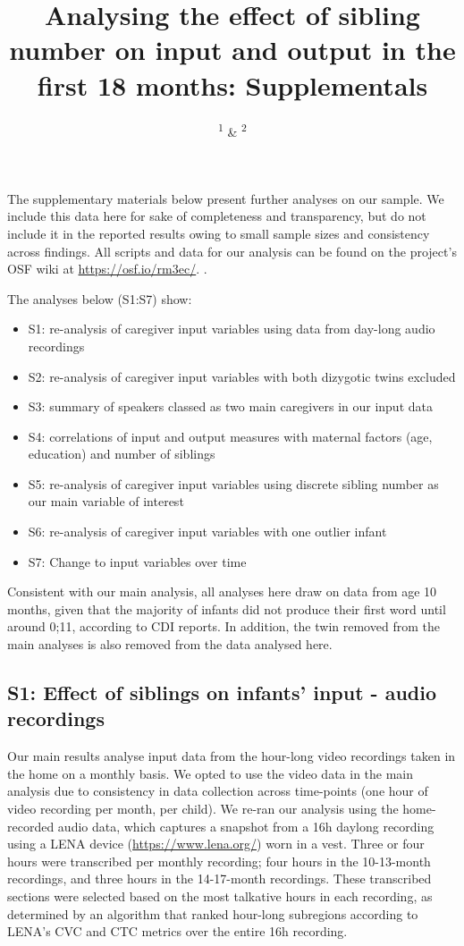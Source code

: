 \documentclass[
  man,mask,floatsintext]{apa6}
\title{Analysing the effect of sibling number on input and output in the first 18 months: Supplementals}
\author{\textsuperscript{1} \& \textsuperscript{2}}
\date{}
\affiliation{\vspace{0.5cm}\textsuperscript{1} \\\textsuperscript{2} }
\providecommand{\tightlist}{%
  \setlength{\itemsep}{0pt}\setlength{\parskip}{0pt}}
\begin{document}
\maketitle

The supplementary materials below present further analyses on our sample. We include this data here for sake of completeness and transparency, but do not include it in the reported results owing to small sample sizes and consistency across findings. All scripts and data for our analysis can be found on the project's OSF wiki at \url{https://osf.io/rm3ec/}. .

The analyses below (S1:S7) show:

\begin{itemize}
\tightlist
\item
  S1: re-analysis of caregiver input variables using data from day-long audio recordings
\item
  S2: re-analysis of caregiver input variables with both dizygotic twins excluded
\item
  S3: summary of speakers classed as two main caregivers in our input data
\item
  S4: correlations of input and output measures with maternal factors (age, education) and number of siblings
\item
  S5: re-analysis of caregiver input variables using discrete sibling number as our main variable of interest
\item
  S6: re-analysis of caregiver input variables with one outlier infant
\item
  S7: Change to input variables over time
\end{itemize}

Consistent with our main analysis, all analyses here draw on data from age 10 months, given that the majority of infants did not produce their first word until around 0;11, according to CDI reports. In addition, the twin removed from the main analyses is also removed from the data analysed here.

\hypertarget{s1-effect-of-siblings-on-infants-input---audio-recordings}{%
\subsection{S1: Effect of siblings on infants' input - audio recordings}\label{s1-effect-of-siblings-on-infants-input---audio-recordings}}

Our main results analyse input data from the hour-long video recordings taken in the home on a monthly basis. We opted to use the video data in the main analysis due to consistency in data collection across time-points (one hour of video recording per month, per child). We re-ran our analysis using the home-recorded audio data, which captures a snapshot from a 16h daylong recording using a LENA device (\url{https://www.lena.org/}) worn in a vest. Three or four hours were transcribed per monthly recording; four hours in the 10-13-month recordings, and three hours in the 14-17-month recordings. These transcribed sections were selected based on the most talkative hours in each recording, as determined by an algorithm that ranked hour-long subregions according to LENA's CVC and CTC metrics over the entire 16h recording.
\end{document}
